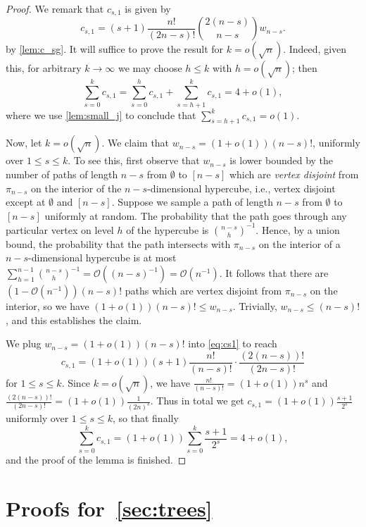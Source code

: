 \documentclass[11pt]{article}
\theoremstyle{definition}
\theoremstyle{remark}
\theoremstyle{remark}
\numberwithin{theorem}{section}
\newcommand{\bigO}{\mathcal{O}}
\begin{document}
\begin{proof}	
    We remark that $c_{s,1}$ is given by
    \begin{equation}\label{eq:cs1}
        c_{s,1}=(s+1)\frac{n!}{(2n-s)!}\binom{2(n-s)}{n-s}w_{n-s}.
    \end{equation}
    by \cref{lem:c_sg}. It will suffice to prove the result for $k = o(\sqrt{n})$. Indeed, given this, for arbitrary $k \to \infty$ we may choose $h \leq k$ with $h = o(\sqrt{n})$; then 
    $$
        \sum_{s=0}^{k}c_{s,1} = \sum_{s=0}^{h}c_{s,1} + \sum_{s=h+1}^{k}c_{s,1} = 4 + o(1),
    $$
    where we use \cref{lem:small_j} to conclude that $\sum_{s=h+1}^{k}c_{s,1} = o(1).$
    
	Now, let $k = o(\sqrt{n})$. We claim that $w_{n-s} = (1+o(1))(n-s)!$, uniformly over $1 \leq s \leq k.$ To see this, first observe that $w_{n-s}$ is lower bounded by the number of paths of length $n-s$ from $\emptyset$ to $[n-s]$ which are \textit{vertex disjoint} from $\pi_{n-s}$ on the interior of the $n-s$-dimensional hypercube, i.e., vertex disjoint except at $\emptyset$ and $[n-s]$. Suppose we sample a path of length $n-s$ from $\emptyset$ to $[n-s]$ uniformly at random. The probability that the path goes through any particular vertex on level $h$ of the hypercube is $\binom{n-s}{h}^{-1}$. Hence, by a union bound, the probability that the path intersects with $\pi_{n-s}$ on the interior of a $n-s$-dimensional hypercube is at most $\sum_{h=1}^{n-1}\binom{n-s}{h}^{-1}= \bigO((n-s)^{-1}) = \bigO(n^{-1}).$ It follows that there are $(1-\bigO(n^{-1}))(n-s)!$ paths which are vertex disjoint from $\pi_{n-s}$ on the interior, so we have $(1+o(1))(n-s)! \leq w_{n-s}$. Trivially, $w_{n-s} \leq (n-s)!$, and this establishes the claim.

    We plug $w_{n-s} =(1+o(1))(n-s)!$ into \eqref{eq:cs1} to reach
    $$
        c_{s,1} = (1+o(1))(s+1)\frac{n!}{(n-s)!}\cdot\frac{(2(n-s))!}{(2n-s)!}
    $$
    for $1 \leq s \leq k$. Since $k = o(\sqrt{n})$, we have $\frac{n!}{(n-s)!} = (1+o(1))n^{s}$ and $\frac{(2(n-s))!}{(2n-s)!} = (1+o(1))\frac{1}{(2n)^{s}}.$ Thus in total we get $c_{s,1} = (1+o(1))\frac{s+1}{2^{s}}$ uniformly over $1 \leq s \leq k$, so that finally
	$$
		\sum_{s=0}^{k}c_{s,1} = (1+o(1))\sum_{s=0}^{k}\frac{s+1}{2^{s}} = 4 + o(1),
	$$
    and the proof of the lemma is finished.
\end{proof}


\section{Proofs for~\cref{sec:trees}}\label{sec:trees_appendix}
\end{document}
